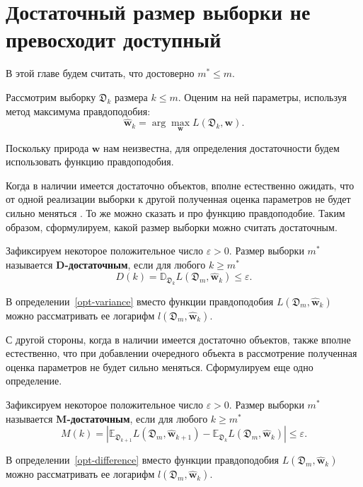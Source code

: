 \chapter{Достаточный размер выборки не превосходит доступный}\label{chap2}

В этой главе будем считать, что достоверно $m^* \leqslant m$.

Рассмотрим выборку $\mathfrak{D}_k$ размера $k \leqslant m$. Оценим на ней параметры, используя метод максимума правдоподобия:
\[ \hat{\mathbf{w}}_{k} = \arg\max_{\mathbf{w}} L(\mathfrak{D}_k, \mathbf{w}). \]

Поскольку природа $\mathbf{w}$ нам неизвестна, для определения достаточности будем использовать функцию правдоподобия.

Когда в наличии имеется достаточно объектов, вполне естественно ожидать, что от одной реализации выборки к другой полученная оценка параметров не будет сильно меняться \cite{Joseph1997, Joseph1995}. То же можно сказать и про функцию правдоподобие. Таким образом, сформулируем, какой размер выборки можно считать достаточным.

\begin{definition}
    \label{opt-variance}
    Зафиксируем некоторое положительное число $\varepsilon > 0$. Размер выборки $m^*$ называется \textbf{D-достаточным}, если для любого $k \geqslant m^*$
    $$ D(k) = \mathbb{D}_{\mathfrak{D}_k} L(\mathfrak{D}_m, \hat{\mathbf{w}}_{k}) \leqslant \varepsilon. $$
\end{definition}
\begin{note}
    В определении~\ref{opt-variance} вместо функции правдоподобия $L(\mathfrak{D}_m, \hat{\mathbf{w}}_{k})$ можно рассматривать ее логарифм $l(\mathfrak{D}_m, \hat{\mathbf{w}}_{k})$.
\end{note}

С другой стороны, когда в наличии имеется достаточно объектов, также вполне естественно, что при добавлении очередного объекта в рассмотрение полученная оценка параметров не будет сильно меняться. Сформулируем еще одно определение.

\begin{definition}
    \label{opt-difference}
    Зафиксируем некоторое положительное число $\varepsilon > 0$. Размер выборки $m^*$ называется \textbf{M-достаточным}, если для любого $k \geqslant m^*$ 
    $$ M(k) = \left| \mathbb{E}_{\mathfrak{D}_{k+1}} L(\mathfrak{D}_m, \hat{\mathbf{w}}_{k+1}) - \mathbb{E}_{\mathfrak{D}_k} L(\mathfrak{D}_m, \hat{\mathbf{w}}_{k}) \right| \leqslant \varepsilon. $$
\end{definition}
\begin{note}
    В определении~\ref{opt-difference} вместо функции правдоподобия $L(\mathfrak{D}_m, \hat{\mathbf{w}}_{k})$ можно рассматривать ее логарифм $l(\mathfrak{D}_m, \hat{\mathbf{w}}_{k})$.
\end{note}

